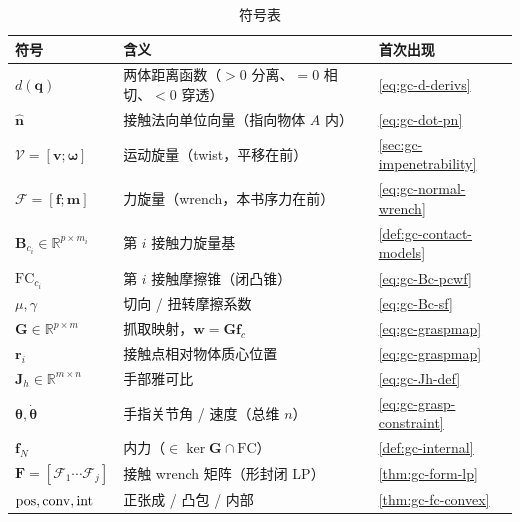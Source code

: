 \begin{table}[H]\centering\small
\caption{符号表}
\label{tab:gc-symbols}
\begin{tabular}{lll}
\toprule
符号 & 含义 & 首次出现 \\
\midrule
$d(\mathbf{q})$ & 两体距离函数（$>0$ 分离、$=0$ 相切、$<0$ 穿透） & \cref{eq:gc-d-derivs} \\
$\hat{\mathbf{n}}$ & 接触法向单位向量（指向物体 $A$ 内） & \cref{eq:gc-dot-pn} \\
$\mathcal{V}=[\mathbf{v};\boldsymbol{\omega}]$ & 运动旋量（twist，平移在前） & \cref{sec:gc-impenetrability} \\
$\mathcal{F}=[\mathbf{f};\mathbf{m}]$ & 力旋量（wrench，本书序力在前） & \cref{eq:gc-normal-wrench} \\
$\mathbf{B}_{c_i}\in\mathbb{R}^{p\times m_i}$ & 第 $i$ 接触力旋量基 & \cref{def:gc-contact-models} \\
$\mathrm{FC}_{c_i}$ & 第 $i$ 接触摩擦锥（闭凸锥） & \cref{eq:gc-Bc-pcwf} \\
$\mu,\gamma$ & 切向 / 扭转摩擦系数 & \cref{eq:gc-Bc-sf} \\
$\mathbf{G}\in\mathbb{R}^{p\times m}$ & 抓取映射，$\mathbf{w}=\mathbf{G}\mathbf{f}_c$ & \cref{eq:gc-graspmap} \\
$\mathbf{r}_i$ & 接触点相对物体质心位置 & \cref{eq:gc-graspmap} \\
$\mathbf{J}_h\in\mathbb{R}^{m\times n}$ & 手部雅可比 & \cref{eq:gc-Jh-def} \\
$\boldsymbol{\theta},\dot{\boldsymbol{\theta}}$ & 手指关节角 / 速度（总维 $n$） & \cref{eq:gc-grasp-constraint} \\
$\mathbf{f}_N$ & 内力（$\in\ker\mathbf{G}\cap\mathrm{FC}$） & \cref{def:gc-internal} \\
$\mathbf{F}=[\mathcal{F}_1\cdots\mathcal{F}_j]$ & 接触 wrench 矩阵（形封闭 LP） & \cref{thm:gc-form-lp} \\
$\operatorname{pos},\operatorname{conv},\operatorname{int}$ & 正张成 / 凸包 / 内部 & \cref{thm:gc-fc-convex} \\
\bottomrule
\end{tabular}
\end{table}


